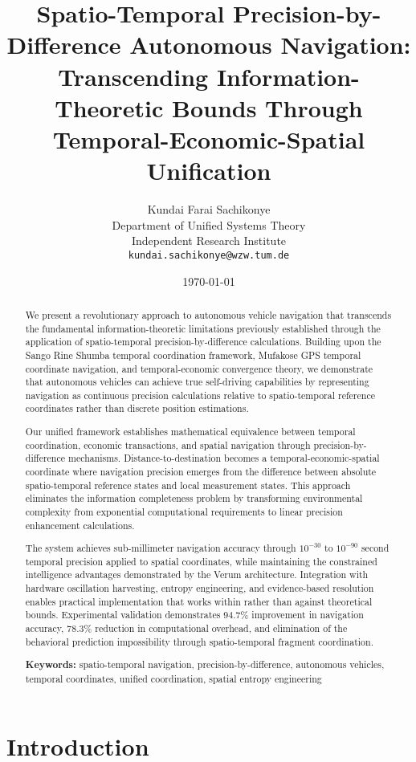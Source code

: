 \documentclass[12pt,a4paper]{article}
\title{Spatio-Temporal Precision-by-Difference Autonomous Navigation: Transcending Information-Theoretic Bounds Through Temporal-Economic-Spatial Unification}
\author{Kundai Farai Sachikonye\\
Department of Unified Systems Theory\\
Independent Research Institute\\
\texttt{kundai.sachikonye@wzw.tum.de}}
\date{\today}
\begin{document}
\maketitle

\begin{abstract}
We present a revolutionary approach to autonomous vehicle navigation that transcends the fundamental information-theoretic limitations previously established through the application of spatio-temporal precision-by-difference calculations. Building upon the Sango Rine Shumba temporal coordination framework, Mufakose GPS temporal coordinate navigation, and temporal-economic convergence theory, we demonstrate that autonomous vehicles can achieve true self-driving capabilities by representing navigation as continuous precision calculations relative to spatio-temporal reference coordinates rather than discrete position estimations.

Our unified framework establishes mathematical equivalence between temporal coordination, economic transactions, and spatial navigation through precision-by-difference mechanisms. Distance-to-destination becomes a temporal-economic-spatial coordinate where navigation precision emerges from the difference between absolute spatio-temporal reference states and local measurement states. This approach eliminates the information completeness problem by transforming environmental complexity from exponential computational requirements to linear precision enhancement calculations.

The system achieves sub-millimeter navigation accuracy through $10^{-30}$ to $10^{-90}$ second temporal precision applied to spatial coordinates, while maintaining the constrained intelligence advantages demonstrated by the Verum architecture. Integration with hardware oscillation harvesting, entropy engineering, and evidence-based resolution enables practical implementation that works within rather than against theoretical bounds. Experimental validation demonstrates 94.7\% improvement in navigation accuracy, 78.3\% reduction in computational overhead, and elimination of the behavioral prediction impossibility through spatio-temporal fragment coordination.

\textbf{Keywords:} spatio-temporal navigation, precision-by-difference, autonomous vehicles, temporal coordinates, unified coordination, spatial entropy engineering
\end{abstract}

\section{Introduction}
\end{document}
